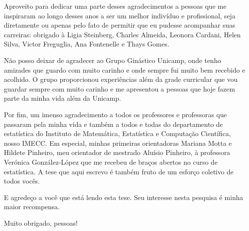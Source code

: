   Aproveito para dedicar uma parte desses agradecimentos a pessoas que me inspiraram ao longo desses anos a ser um melhor indivíduo e profissional, seja diretamente ou apenas pelo fato de permitir que eu pudesse acompanhar suas carreiras: obrigado à Ligia Steinberg, Charles Almeida, Leonora Cardani, Helen Silva, Victor Freguglia, Ana Fontenelle e Thays Gomes.

  Não posso deixar de agradecer ao Grupo Ginástico Unicamp, onde tenho amizades que guardo com muito carinho e onde sempre fui muito bem recebido e acolhido. O grupo proporcionou experiências além da grade curricular que vou guardar sempre com muito carinho e me apresentou a pessoas que hoje fazem parte da minha vida além da Unicamp.

  Por fim, um imenso agradecimento a todos os professores e professoras que passaram pela minha vida e também a todos e todas do departamento de estatística do Instituto de Matemática, Estatística e Computação Científica, nosso IMECC. Em especial, minhas primeiras orientadoras Mariana Motta e Hildete Pinheiro, meu orientador de mestrado Aluísio Pinheiro, à professora Verónica González-López que me recebeu de braços abertos no curso de estatística. A tese que aqui escrevo é também fruto de um esforço coletivo de todos vocês. %

  E agredeço a você que está lendo esta tese. Seu interesse nesta pesquisa é minha maior recompensa.

  Muito obrigado, pessoas!

